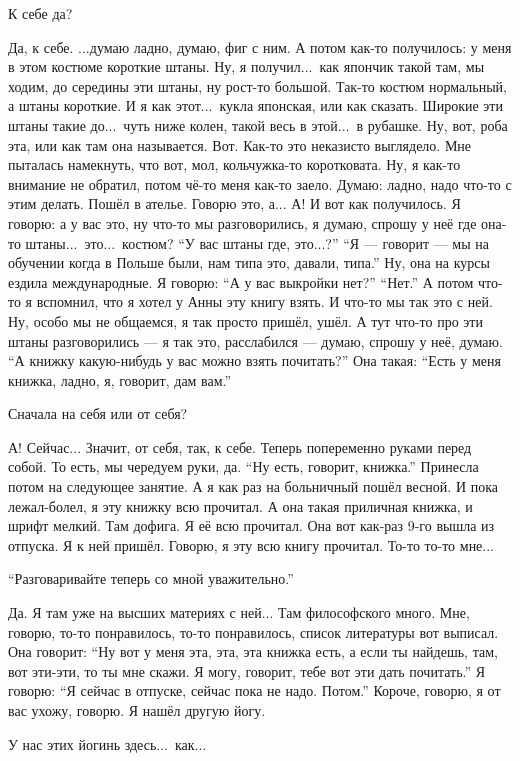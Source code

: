 \M
К себе да?

\I
Да, к себе.
...думаю ладно, думаю, фиг с ним.
А потом как-то получилось: у меня в этом костюме короткие штаны.
Ну, я получил...\ как япончик такой там, мы ходим, до середины эти штаны, ну рост-то большой.
Так-то костюм нормальный, а штаны короткие. И я как этот...\ кукла японская, или как сказать.
Широкие эти штаны такие до...\ чуть ниже колен, такой весь в этой...\ в рубашке.
Ну, вот, роба эта, или как там она называется.
Вот.
Как-то это неказисто выглядело.
Мне пыталась намекнуть, что вот, мол, кольчужка-то коротковата.
Ну, я как-то внимание не обратил, потом чё-то меня как-то заело.
Думаю: ладно, надо что-то с этим делать.
Пошёл в ателье.
Говорю это, а... А! И вот как получилось.
Я говорю: а у вас это, ну что-то мы разговорились,
я думаю, спрошу у неё где она-то штаны...\ это...\ костюм?
``У вас штаны где, это...?''
``Я --- говорит --- мы на обучении когда в Польше были, нам типа это, давали, типа.''
Ну, она на курсы ездила международные.
Я говорю: ``А у вас выкройки нет?''
``Нет.''
А потом что-то я вспомнил, что я хотел у Анны эту книгу взять.
И что-то мы так это с ней.
Ну, особо мы не общаемся, я так просто пришёл, ушёл.
А тут что-то про эти штаны разговорились --- я так это, расслабился --- думаю, спрошу у неё,
думаю. ``А книжку какую-нибудь у вас можно взять почитать?''
Она такая: ``Есть у меня книжка, ладно, я, говорит, дам вам.''

\M
Сначала на себя или от себя?

\I
А! Сейчас... Значит, от себя, так, к себе.
Теперь попеременно руками перед собой.
То есть, мы чередуем руки, да.
``Ну есть, говорит, книжка.''
Принесла потом на следующее занятие.
А я как раз на больничный пошёл весной. И пока лежал-болел, я эту
книжку всю прочитал. А она такая приличная книжка, и шрифт мелкий.
Там дофига. Я её всю прочитал.
Она вот как-раз 9-го вышла из отпуска. Я к ней пришёл.
Говорю, я эту всю книгу прочитал. То-то то-то мне...

\M
``Разговаривайте теперь со мной уважительно.''

\I
Да. Я там уже на высших материях с ней... Там философского много.
Мне, говорю, то-то понравилось, то-то понравилось, список литературы вот выписал.
Она говорит: ``Ну вот у меня эта, эта, эта книжка есть, а если ты найдешь, там, вот эти-эти,
то ты мне скажи. Я могу, говорит, тебе вот эти дать почитать.''
Я говорю: ``Я сейчас в отпуске, сейчас пока не надо. Потом.''
Короче, говорю, я от вас ухожу, говорю. Я нашёл другую йогу.

\M
У нас этих йогинь здесь...\ как...

